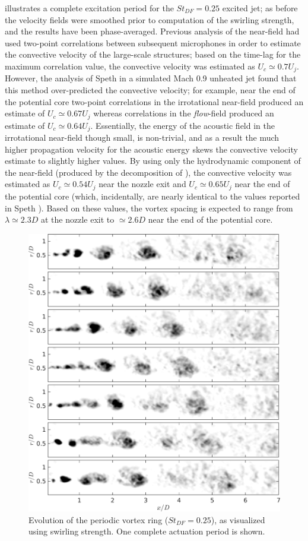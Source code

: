  illustrates a complete excitation period for the $St_{DF} = 0.25$ excited jet; as before the velocity fields were smoothed prior to computation of the swirling strength, and the results have been phase-averaged.
Previous analysis of the near-field had used two-point correlations between subsequent microphones in order to estimate the convective velocity of the large-scale structures; based on the time-lag for the maximum correlation value, the convective velocity was estimated as $U_c \simeq 0.7 U_j$.
However, the analysis of Speth \citep{Speth2015} in a simulated Mach 0.9 unheated jet found that this method over-predicted the convective velocity; for example, near the end of the potential core two-point correlations in the irrotational near-field produced an estimate of $U_c \simeq 0.67 U_j$ whereas correlations in the \textit{flow}-field produced an estimate of $U_c \simeq 0.64 U_j$.
Essentially, the energy of the acoustic field in the irrotational near-field though small, is non-trivial, and as a result the much higher propagation velocity for the acoustic energy skews the convective velocity estimate to slightly higher values.
By using only the hydrodynamic component of the near-field (produced by the decomposition of ), the convective velocity was estimated as $U_c \simeq 0.54 U_j$ near the nozzle exit and $U_c \simeq 0.65 U_j$ near the end of the potential core (which, incidentally, are nearly identical to the values reported in Speth \citep{Speth2015}).
Based on these values, the vortex spacing is expected to range from $\lambda \simeq 2.3D$ at the nozzle exit to $\simeq 2.6D$ near the end of the potential core.
\begin{figure}
	\centering
	\includegraphics[width=5in]{Figures/ch4_St025_lambda.png}
	\caption{Evolution of the periodic vortex ring ($St_{DF}=0.25$), as visualized using swirling strength. One complete actuation period is shown.}
	\label{fig:ch4_period_structure_disintegration}
\end{figure}
